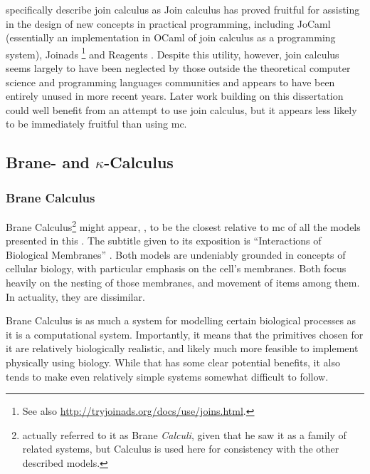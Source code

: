 \citeauthor{Fournet2002} specifically describe join calculus as   Join calculus has proved fruitful for assisting in the design of new concepts in practical programming, including JoCaml \cite{Fournet2003} (essentially an implementation in OCaml of join calculus as a programming system), Joinads \cite{Petricek2011}\footnote{See also \url{http://tryjoinads.org/docs/use/joins.html}.} and Reagents \cite{Turon2012}.  Despite this utility, however, join calculus seems largely to have been neglected by those outside the theoretical computer science and programming languages communities and appears to have been entirely unused in more recent years.  Later work building on this dissertation could well benefit from an attempt to use join calculus, but it appears less likely to be immediately fruitful than using \gls{mc}.

\subsection[Brane- and Kappa-Calculus]{Brane- and \(\kappa\)-Calculus}
\subsubsection{Brane Calculus}
Brane Calculus\footnote{\citeauthor{Cardelli2005} actually referred to it as Brane \emph{Calculi}, given that he saw it as a family of related systems, but Calculus is used here for consistency with the other described models.} might appear, , to be the closest relative to \gls{mc} of all the models presented in this .  The subtitle given to its exposition is \enquote{Interactions of Biological Membranes} \cite{Cardelli2005}.  Both models are undeniably grounded in concepts of cellular biology, with particular emphasis on the cell's membranes.  Both focus heavily on the nesting of those membranes, and movement of items among them.  In actuality, they are dissimilar.

Brane Calculus is as much a system for modelling certain biological processes as it is a computational system.  Importantly, it means that the primitives chosen for it are relatively biologically realistic, and likely much more feasible to implement physically using biology.  While that has some clear potential benefits, it also tends to make even relatively simple systems somewhat difficult to follow.

